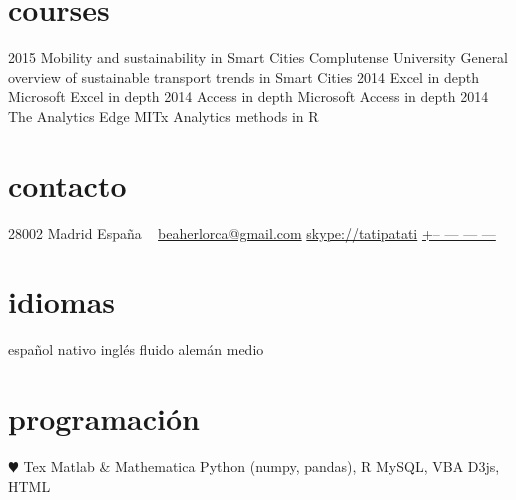 \documentclass[]{friggeri-cv}
\begin{document}
\section{courses}

\begin{entrylist}
  \entry
    {2015}
    {Mobility and sustainability in Smart Cities}
    {Complutense University}
    {General overview of sustainable transport trends in Smart Cities}
  \entry
    {2014}
    {Excel in depth}
    {}
    {Microsoft Excel in depth}
  \entry
    {2014}
    {Access in depth}
    {}
    {Microsoft Access in depth}
  \entry
    {2014}
    {The Analytics Edge}
    {MITx}
    {Analytics methods in R}
\end{entrylist}




\else 

       {}


\begin{aside}
  \section{contacto}
    28002 Madrid
    España
    ~
    \href{mailto:beaherlorca@gmail.com}{beaherlorca@gmail.com}
    \href{skype:<tatipatati>[add]}{skype://tatipatati}
    \href{tel:xxxxxxxxxxx}{+-- --- --- ---}
  \section{idiomas}
    español nativo
    inglés fluido
    alemán medio
  \section{programación}
    {\color{red} $\varheartsuit$} Tex
    Matlab \& Mathematica
    Python (numpy, pandas), R
    MySQL, VBA
    D3js, HTML
\end{aside}
\end{document}
